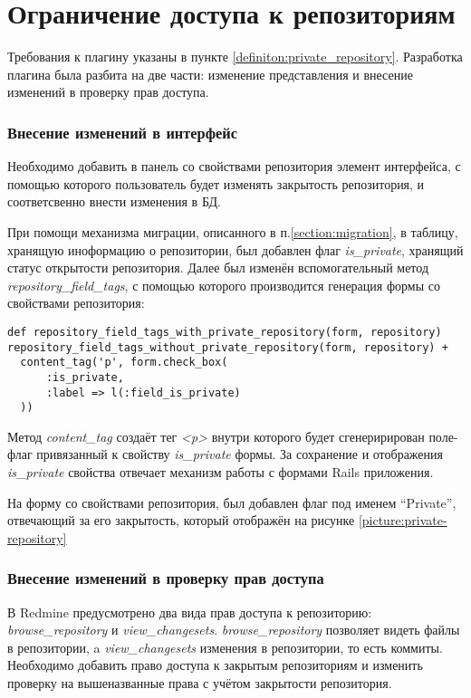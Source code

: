 \section{Ограничение доступа к репозиториям}
Требования к плагину указаны в пункте \ref{definiton:private_repository}.
Разработка плагина была разбита на две части: изменение представления и
внесение изменений в проверку прав доступа.

\subsubsection{Внесение изменений в интерфейс}
Необходимо добавить в панель со свойствами репозитория элемент интерфейса,
с помощью которого пользователь будет изменять закрытость репозитория, и
соответсвенно внести изменения в БД.

При помощи механизма миграции, описанного в п.\ref{section:migration}, в
таблицу, хранящую иноформацию о репозитории, был добавлен флаг
\textit{is\_private}, хранящий статус открытости репозитория. Далее был изменён
вспомогательный метод \textit{repository\_field\_tags}, с помощью которого
производится генерация формы со свойствами репозитория:
\small{\begin{lstlisting}
def repository_field_tags_with_private_repository(form, repository)
repository_field_tags_without_private_repository(form, repository) +
  content_tag('p', form.check_box(
      :is_private,
      :label => l(:field_is_private)
  ))
\end{lstlisting}}
Метод \textit{content\_tag} создаёт тег \textit{<p>} внутри которого будет
сгенеририрован поле-флаг привязанный к свойству \textit{is\_private} формы.
За сохранение и отображения \textit{is\_private} свойства отвечает механизм
работы с формами Rails приложения.

На форму со свойствами репозитория, был добавлен флаг под именем ``Private'',
отвечающий за его закрытость, который отображён на рисунке
\ref{picture:private-repository}

\subsubsection{Внесение изменений в проверку прав доступа}
В Redmine предусмотрено два вида прав доступа к репозиторию:
\textit{browse\_repository} и \textit{view\_changesets}.
\textit{browse\_repository} позволяет видеть файлы в репозитории, a
\textit{view\_changesets} изменения в репозитории, то есть коммиты. 
Необходимо добавить право доступа к закрытым репозиториям и изменить проверку
на вышеназванные права с учётом закрытости репозитория.

